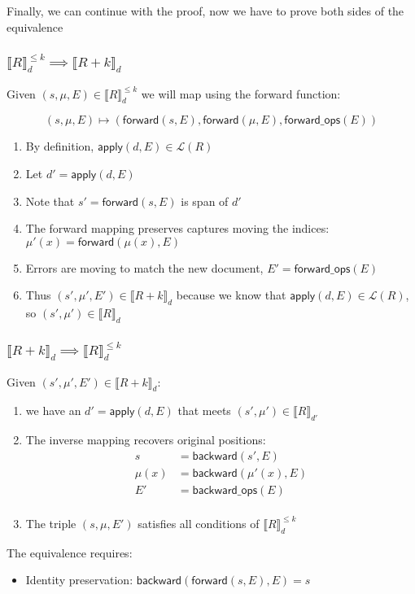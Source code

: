 \documentclass{article}
\begin{document}
Finally, we can continue with the proof, now we have to prove both sides of the equivalence

\subsubsection{$\llbracket R \rrbracket^{\leq k}_d \implies \llbracket R + k \rrbracket_d$}
Given $(s, \mu, E) \in \llbracket R \rrbracket^{\leq k}_d$ we will map using the forward function:

\[(s, \mu, E) \mapsto (\mathsf{forward}(s,E), \mathsf{forward}(\mu, E), \mathsf{forward\_ops}(E))\]

\begin{enumerate}
\item By definition, $\mathsf{apply}(d,E) \in \mathcal{L}(R)$
\item Let $d' = \mathsf{apply}(d,E)$
\item Note that $s' = \mathsf{forward}(s,E)$ is span of $d'$
\item The forward mapping preserves captures moving the indices: $\mu'(x) = \mathsf{forward}(\mu(x), E)$
\item Errors are moving to match the new document, $E' = \mathsf{forward\_ops}(E)$
\item Thus $(s', \mu', E') \in \llbracket R + k \rrbracket_d$ because we know that $\mathsf{apply}(d,E) \in \mathcal{L}(R)$, so $(s', \mu') \in \llbracket R \rrbracket_d$
\end{enumerate}

\subsubsection{$\llbracket R + k \rrbracket_d \implies \llbracket R \rrbracket^{\leq k}_d$}
Given $(s', \mu', E') \in \llbracket R + k \rrbracket_d$:
\begin{enumerate}
\item we have an $d' = \mathsf{apply}(d,E)$ that meets $(s', \mu') \in \llbracket R \rrbracket_{d'}$
\item The inverse mapping recovers original positions:
\begin{align*}
s &= \mathsf{backward}(s', E) \\
\mu(x) &= \mathsf{backward}(\mu'(x), E) \\
E' &= \mathsf{backward\_ops}(E)\\
\end{align*}
\item The triple $(s, \mu, E')$ satisfies all conditions of $\llbracket R \rrbracket^{\leq k}_d$
\end{enumerate}



The equivalence requires:
\begin{itemize}
\item Identity preservation: $\mathsf{backward}(\mathsf{forward}(s,E),E) = s$
\end{itemize}
\end{document}
